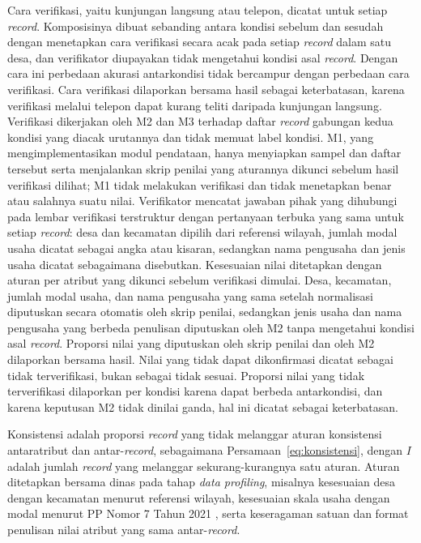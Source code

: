 Cara verifikasi, yaitu kunjungan langsung atau telepon, dicatat untuk setiap \textit{record}. Komposisinya dibuat sebanding antara kondisi sebelum dan sesudah dengan menetapkan cara verifikasi secara acak pada setiap \textit{record} dalam satu desa, dan verifikator diupayakan tidak mengetahui kondisi asal \textit{record}. Dengan cara ini perbedaan akurasi antarkondisi tidak bercampur dengan perbedaan cara verifikasi. Cara verifikasi dilaporkan bersama hasil sebagai keterbatasan, karena verifikasi melalui telepon dapat kurang teliti daripada kunjungan langsung. Verifikasi dikerjakan oleh M2 dan M3 terhadap daftar \textit{record} gabungan kedua kondisi yang diacak urutannya dan tidak memuat label kondisi. M1, yang mengimplementasikan modul pendataan, hanya menyiapkan sampel dan daftar tersebut serta menjalankan skrip penilai yang aturannya dikunci sebelum hasil verifikasi dilihat; M1 tidak melakukan verifikasi dan tidak menetapkan benar atau salahnya suatu nilai. Verifikator mencatat jawaban pihak yang dihubungi pada lembar verifikasi terstruktur dengan pertanyaan terbuka yang sama untuk setiap \textit{record}: desa dan kecamatan dipilih dari referensi wilayah, jumlah modal usaha dicatat sebagai angka atau kisaran, sedangkan nama pengusaha dan jenis usaha dicatat sebagaimana disebutkan. Kesesuaian nilai ditetapkan dengan aturan per atribut yang dikunci sebelum verifikasi dimulai. Desa, kecamatan, jumlah modal usaha, dan nama pengusaha yang sama setelah normalisasi diputuskan secara otomatis oleh skrip penilai, sedangkan jenis usaha dan nama pengusaha yang berbeda penulisan diputuskan oleh M2 tanpa mengetahui kondisi asal \textit{record}. Proporsi nilai yang diputuskan oleh skrip penilai dan oleh M2 dilaporkan bersama hasil. Nilai yang tidak dapat dikonfirmasi dicatat sebagai tidak terverifikasi, bukan sebagai tidak sesuai. Proporsi nilai yang tidak terverifikasi dilaporkan per kondisi karena dapat berbeda antarkondisi, dan karena keputusan M2 tidak dinilai ganda, hal ini dicatat sebagai keterbatasan.

Konsistensi adalah proporsi \textit{record} yang tidak melanggar aturan konsistensi antaratribut dan antar-\textit{record}, sebagaimana Persamaan~\eqref{eq:konsistensi}, dengan $I$ adalah jumlah \textit{record} yang melanggar sekurang-kurangnya satu aturan. Aturan ditetapkan bersama dinas pada tahap \textit{data profiling}, misalnya kesesuaian desa dengan kecamatan menurut referensi wilayah, kesesuaian skala usaha dengan modal menurut PP Nomor 7 Tahun 2021 \cite{pp7tahun2021}, serta keseragaman satuan dan format penulisan nilai atribut yang sama antar-\textit{record}.

